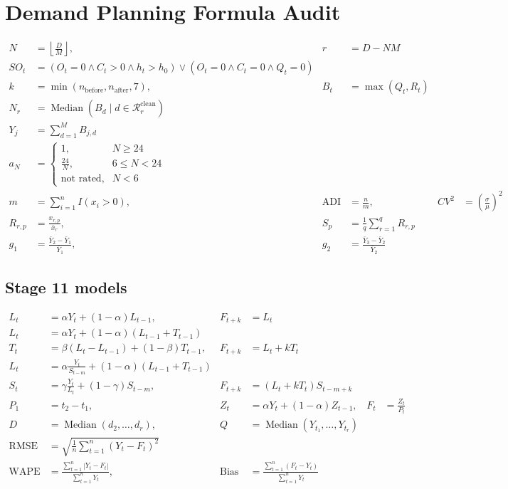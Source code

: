 \documentclass{article}
\begin{document}
\section*{Demand Planning Formula Audit}

\begin{align*}
N&=\left\lfloor\frac{D}{M}\right\rfloor,& r&=D-NM \\
SO_t&=(O_t=0\land C_t>0\land h_t>h_0)\lor(O_t=0\land C_t=0\land Q_t=0) \\
k&=\min(n_{\mathrm{before}},n_{\mathrm{after}},7),& B_t&=\max(Q_t,R_t) \\
N_r&=\operatorname{Median}\!\left(B_d\mid d\in\mathcal{R}_r^{\mathrm{clean}}\right) \\
Y_j&=\sum_{d=1}^{M}B_{j,d} \\
a_N&=\begin{cases}1,&N\ge24\\\frac{24}{N},&6\le N<24\\\text{not rated},&N<6\end{cases} \\
m&=\sum_{i=1}^{n}I(x_i>0),& \operatorname{ADI}&=\frac{n}{m},& CV^2&=\left(\frac{\sigma}{\mu}\right)^2 \\
R_{r,p}&=\frac{x_{r,p}}{\bar{x}_r},& S_p&=\frac{1}{q}\sum_{r=1}^{q}R_{r,p} \\
g_1&=\frac{\bar{Y}_2-\bar{Y}_1}{\bar{Y}_1},& g_2&=\frac{\bar{Y}_3-\bar{Y}_2}{\bar{Y}_2}
\end{align*}

\subsection*{Stage 11 models}
\begin{align*}
L_t&=\alpha Y_t+(1-\alpha)L_{t-1},& F_{t+k}&=L_t \\
L_t&=\alpha Y_t+(1-\alpha)(L_{t-1}+T_{t-1}) \\
T_t&=\beta(L_t-L_{t-1})+(1-\beta)T_{t-1},& F_{t+k}&=L_t+kT_t \\
L_t&=\alpha\frac{Y_t}{S_{t-m}}+(1-\alpha)(L_{t-1}+T_{t-1}) \\
S_t&=\gamma\frac{Y_t}{L_t}+(1-\gamma)S_{t-m},& F_{t+k}&=(L_t+kT_t)S_{t-m+k} \\
P_1&=t_2-t_1,& Z_t&=\alpha Y_t+(1-\alpha)Z_{t-1},& F_t&=\frac{Z_t}{P_t} \\
D&=\operatorname{Median}(d_2,\ldots,d_r),& Q&=\operatorname{Median}(Y_{t_1},\ldots,Y_{t_r}) \\
\operatorname{RMSE}&=\sqrt{\frac{1}{n}\sum_{t=1}^{n}(Y_t-F_t)^2} \\
\operatorname{WAPE}&=\frac{\sum_{t=1}^{n}|Y_t-F_t|}{\sum_{t=1}^{n}Y_t},&
\operatorname{Bias}&=\frac{\sum_{t=1}^{n}(F_t-Y_t)}{\sum_{t=1}^{n}Y_t}
\end{align*}
\end{document}
